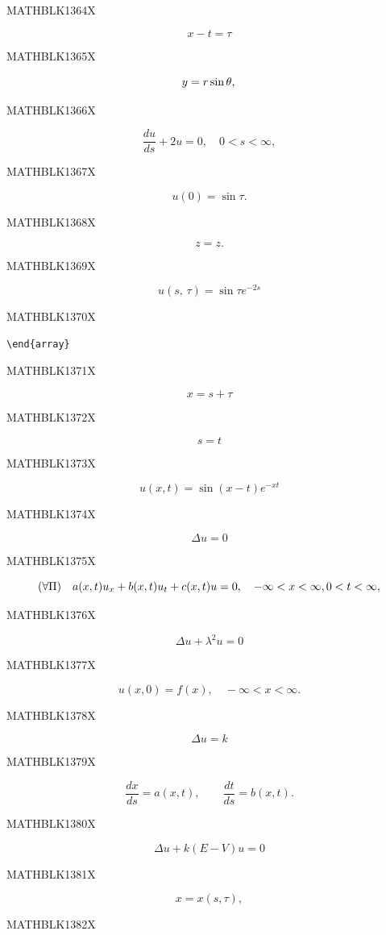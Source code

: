 \documentclass[
  ukrainian,
]{article}
\begin{document}
MATHBLK1364X

\[
x-t=\tau
\]

MATHBLK1365X

\[
y = r \sin \theta, \\
\]

MATHBLK1366X

\[
\frac{du}{ds} + 2u = 0, \quad 0 < s < \infty,
\]

MATHBLK1367X

\[
u(0) = \sin \tau.
\]

MATHBLK1368X

\[
z = z.
\]

MATHBLK1369X

\[
u\left(s,\,\tau\right)=\sin\tau e^{-2s}
\]

MATHBLK1370X

\begin{verbatim}
\end{array}
\end{verbatim}

MATHBLK1371X

\[
x = s + \tau
\]

MATHBLK1372X

\[
s=t
\]

MATHBLK1373X

\[
u(x, t) = \sin(x-t)e^{-xt}
\]

MATHBLK1374X

\[
\Delta u = 0
\]

MATHBLK1375X

\[
(\forall \Pi) \quad a(x, t) u_x + b(x, t) u_t + c(x, t) u = 0, \quad -\infty < x < \infty, \\ 0 < t < \infty,
\]

MATHBLK1376X

\[
\Delta u + \lambda^2 u = 0
\]

MATHBLK1377X

\[
u(x, 0) = f(x), \quad -\infty < x < \infty.
\]

MATHBLK1378X

\[
\Delta u = k
\]

MATHBLK1379X

\[
\frac{dx}{ds} = a(x, t), \qquad \frac{dt}{ds} = b(x, t).
\]

MATHBLK1380X

\[
\Delta u + k(E - V)u = 0
\]

MATHBLK1381X

\[
x = x (s, \tau),
\]

MATHBLK1382X
\end{document}
